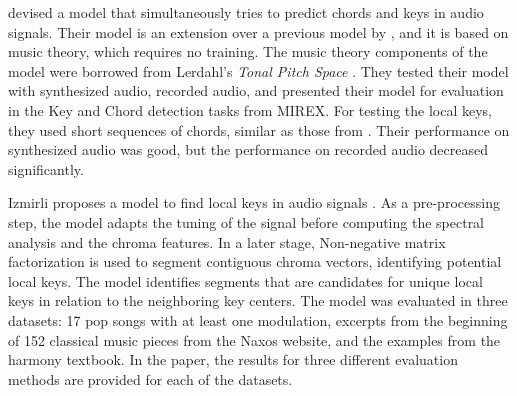 


\textcite{catteau2007probabilistic} devised a model that
simultaneously tries to predict chords and keys in audio
signals. Their model is an extension over a previous model
by \textcite{bello2005robust}, and it is based on music
theory, which requires no training. The music theory
components of the model were borrowed from Lerdahl's
\emph{Tonal Pitch Space} \parencite{lerdahl2005tonal}. They
tested their model with synthesized audio, recorded audio,
and presented their model for evaluation in the Key and
Chord detection tasks from MIREX. For testing the local
keys, they used short sequences of chords, similar as those
from \textcite{krumhansl1982tracing}. Their performance on
synthesized audio was good, but the performance on recorded
audio decreased significantly.



Izmirli proposes a model to find local keys in audio signals
\textcite{izmirli2007localized}. As a pre-processing step,
the model adapts the tuning of the signal before computing
the spectral analysis and the chroma features. In a later
stage, Non-negative matrix factorization is used to segment
contiguous chroma vectors, identifying potential local keys.
The model identifies segments that are candidates for unique
local keys in relation to the neighboring key centers. The
model was evaluated in three datasets: 17 pop songs with at
least one modulation, excerpts from the beginning of 152
classical music pieces from the Naxos website, and the
examples from the \textcite{kostka1984tonal} harmony
textbook. In the paper, the results for three different
evaluation methods are provided for each of the datasets.

